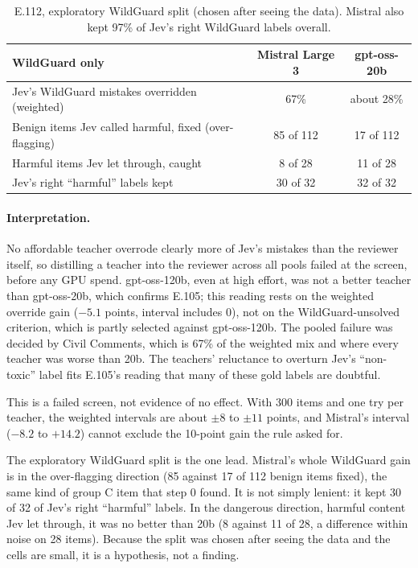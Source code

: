 \documentclass[11pt]{article}
\renewcommand{\_}{\origunderscore\allowbreak}
\begin{document}
\begin{table}[H]
\centering
\small
\begin{tabular}{@{}lcc@{}}
\toprule
WildGuard only & Mistral Large 3 & gpt-oss-20b \\
\midrule
Jev's WildGuard mistakes overridden (weighted) & 67\% & about 28\% \\
Benign items Jev called harmful, fixed (over-flagging) & 85 of 112 & 17 of 112 \\
Harmful items Jev let through, caught & 8 of 28 & 11 of 28 \\
Jev's right ``harmful'' labels kept & 30 of 32 & 32 of 32 \\
\bottomrule
\end{tabular}
\caption{E.112, exploratory WildGuard split (chosen after seeing the data). Mistral also kept 97\% of Jev's right WildGuard labels overall.}
\label{tab:e112-wg}
\end{table}

\paragraph{Interpretation.}
No affordable teacher overrode clearly more of Jev's mistakes than the reviewer itself, so distilling a teacher into the reviewer across all pools failed at the screen, before any GPU spend. gpt-oss-120b, even at high effort, was not a better teacher than gpt-oss-20b, which confirms E.105; this reading rests on the weighted override gain ($-5.1$ points, interval includes 0), not on the WildGuard-unsolved criterion, which is partly selected against gpt-oss-120b. The pooled failure was decided by Civil Comments, which is 67\% of the weighted mix and where every teacher was worse than 20b. The teachers' reluctance to overturn Jev's ``non-toxic'' label fits E.105's reading that many of these gold labels are doubtful.

This is a failed screen, not evidence of no effect. With 300 items and one try per teacher, the weighted intervals are about $\pm 8$ to $\pm 11$ points, and Mistral's interval ($-8.2$ to $+14.2$) cannot exclude the 10-point gain the rule asked for.

The exploratory WildGuard split is the one lead. Mistral's whole WildGuard gain is in the over-flagging direction (85 against 17 of 112 benign items fixed), the same kind of group C item that step 0 found. It is not simply lenient: it kept 30 of 32 of Jev's right ``harmful'' labels. In the dangerous direction, harmful content Jev let through, it was no better than 20b (8 against 11 of 28, a difference within noise on 28 items). Because the split was chosen after seeing the data and the cells are small, it is a hypothesis, not a finding.
\end{document}
